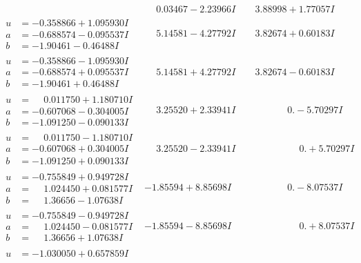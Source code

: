 \documentclass[1p]{elsarticle_modified}
\theoremstyle{definition}
\begin{document}
$$\begin{array}{c|c|c}
 & \phantom{-}0.03467 - 2.23966 I & \phantom{-}3.88998 + 1.77057 I \\ \hline\begin{aligned}
u &= -0.358866 + 1.095930 I \\
a &= -0.688574 - 0.095537 I \\
b &= -1.90461 - 0.46488 I\end{aligned}
 & \phantom{-}5.14581 - 4.27792 I & \phantom{-}3.82674 + 0.60183 I \\ \hline\begin{aligned}
u &= -0.358866 - 1.095930 I \\
a &= -0.688574 + 0.095537 I \\
b &= -1.90461 + 0.46488 I\end{aligned}
 & \phantom{-}5.14581 + 4.27792 I & \phantom{-}3.82674 - 0.60183 I \\ \hline\begin{aligned}
u &= \phantom{-}0.011750 + 1.180710 I \\
a &= -0.607068 - 0.304005 I \\
b &= -1.091250 - 0.090133 I\end{aligned}
 & \phantom{-}3.25520 + 2.33941 I & \phantom{-0.000000 } 0. - 5.70297 I \\ \hline\begin{aligned}
u &= \phantom{-}0.011750 - 1.180710 I \\
a &= -0.607068 + 0.304005 I \\
b &= -1.091250 + 0.090133 I\end{aligned}
 & \phantom{-}3.25520 - 2.33941 I & \phantom{-0.000000 -}0. + 5.70297 I \\ \hline\begin{aligned}
u &= -0.755849 + 0.949728 I \\
a &= \phantom{-}1.024450 + 0.081577 I \\
b &= \phantom{-}1.36656 - 1.07638 I\end{aligned}
 & -1.85594 + 8.85698 I & \phantom{-0.000000 } 0. - 8.07537 I \\ \hline\begin{aligned}
u &= -0.755849 - 0.949728 I \\
a &= \phantom{-}1.024450 - 0.081577 I \\
b &= \phantom{-}1.36656 + 1.07638 I\end{aligned}
 & -1.85594 - 8.85698 I & \phantom{-0.000000 -}0. + 8.07537 I \\ \hline\begin{aligned}
u &= -1.030050 + 0.657859 I \\

\end{aligned}
\end{array}$$
\end{document}
